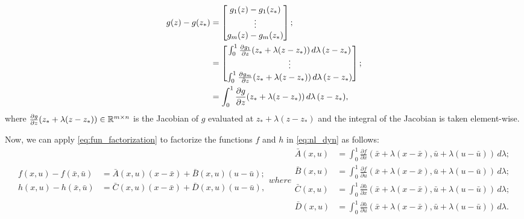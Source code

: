 \begin{align}
	\label{eq:fun_factorization}
	g(z) - g(z_{\ast}) & = \begin{bmatrix}
		                      g_1(z) - g_1(z_{\ast}) \\
		                      \vdots                \\
		                      g_m(z) - g_m(z_{\ast})
	                      \end{bmatrix}; \notag                                                                                         \\
	                  & = \begin{bmatrix}
		                      \int_{0}^{1} \frac{\partial g_1}{\partial z}(z_{\ast} + \lambda(z - z_{\ast})) \, d \lambda \, (z - z_{\ast}) \\
		                      \vdots                                                                                       \\
		                      \int_{0}^{1} \frac{\partial g_m}{\partial z}(z_{\ast} + \lambda(z - z_{\ast})) \, d \lambda \, (z - z_{\ast})
	                      \end{bmatrix}; \notag \\
	                  & = \int_{0}^{1} \frac{\partial g}{\partial z}(z_{\ast} + \lambda(z - z_{\ast})) \, d \lambda \, (z - z_{\ast}),
\end{align}
where $\frac{\partial g}{\partial z}(z_{\ast} + \lambda(z - z_{\ast})) \in \mathbb{R}^{m \times n}$ is the Jacobian of $g$ evaluated at $z_{\ast} + \lambda(z - z_{\ast})$ and the integral of the Jacobian is taken element-wise.


Now, we can apply \eqref{eq:fun_factorization} to factorize the functions $f$ and $h$ in \eqref{eq:nl_dyn} as follows:
\begin{subequations}
	\label{eq:factorized_nl}
	\begin{align}
		f(x, u) - f(\bar{x}, \bar{u}) & = \bar{A}(x, u) (x - \bar{x}) + \bar{B}(x, u) (u - \bar{u}); \\
		h(x, u) - h(\bar{x}, \bar{u}) & = \bar{C}(x, u) (x - \bar{x}) + \bar{D}(x, u) (u - \bar{u}),
	\end{align}
	where
	\begin{align*}
		\bar{A}(x, u) & = \int_{0}^{1} \frac{\partial f}{\partial x}\left(\bar{x} + \lambda (x - \bar{x}), \bar{u} + \lambda (u - \bar{u})\right) \, d \lambda;  \\
		\bar{B}(x, u) & = \int_{0}^{1} \frac{\partial f}{\partial u}\left(\bar{x} + \lambda (x - \bar{x}) , \bar{u} + \lambda (u - \bar{u})\right) \, d \lambda; \\
		\bar{C}(x, u) & = \int_{0}^{1} \frac{\partial h}{\partial x}\left(\bar{x} + \lambda (x - \bar{x}), \bar{u} + \lambda (u - \bar{u})\right) \, d \lambda;  \\
		\bar{D}(x, u) & = \int_{0}^{1} \frac{\partial h}{\partial u}\left(\bar{x} + \lambda (x - \bar{x}), \bar{u} + \lambda (u - \bar{u})\right) \, d \lambda.
	\end{align*}
\end{subequations}

